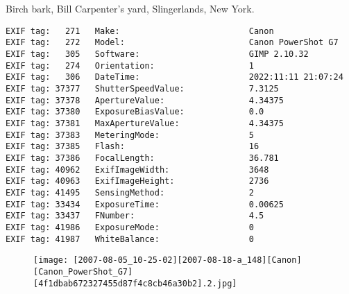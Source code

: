 \section{\protect{}}
\noindent Birch bark, Bill Carpenter's yard, Slingerlands, New York.
\noindent
\begin{lstlisting}
EXIF tag:   271   Make:                          Canon
EXIF tag:   272   Model:                         Canon PowerShot G7
EXIF tag:   305   Software:                      GIMP 2.10.32
EXIF tag:   274   Orientation:                   1
EXIF tag:   306   DateTime:                      2022:11:11 21:07:24
EXIF tag: 37377   ShutterSpeedValue:             7.3125
EXIF tag: 37378   ApertureValue:                 4.34375
EXIF tag: 37380   ExposureBiasValue:             0.0
EXIF tag: 37381   MaxApertureValue:              4.34375
EXIF tag: 37383   MeteringMode:                  5
EXIF tag: 37385   Flash:                         16
EXIF tag: 37386   FocalLength:                   36.781
EXIF tag: 40962   ExifImageWidth:                3648
EXIF tag: 40963   ExifImageHeight:               2736
EXIF tag: 41495   SensingMethod:                 2
EXIF tag: 33434   ExposureTime:                  0.00625
EXIF tag: 33437   FNumber:                       4.5
EXIF tag: 41986   ExposureMode:                  0
EXIF tag: 41987   WhiteBalance:                  0

\end{lstlisting}
\clearpage
\begin{figure}
\raggedleft
\texttt{[image: [2007-08-05\_10-25-02][2007-08-18-a\_148][Canon][Canon\_PowerShot\_G7][4f1dbab672327455d87f4c8cb46a30b2].2.jpg]}
\end{figure}


\clearpage
